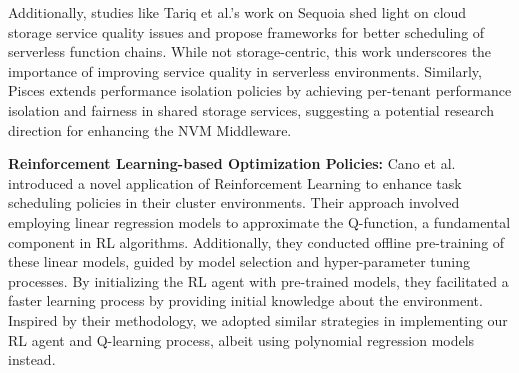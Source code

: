 Additionally, studies like Tariq et al.'s work on Sequoia \cite{tariq2020sequoia} shed light on cloud storage service quality issues and propose frameworks for better scheduling of serverless function chains. While not storage-centric, this work underscores the importance of improving service quality in serverless environments. Similarly, Pisces \cite{180275} extends performance isolation policies by achieving per-tenant performance isolation and fairness in shared storage services, suggesting a potential research direction for enhancing the NVM Middleware.

\textbf{Reinforcement Learning-based Optimization Policies:} Cano et al. \cite{cano2017curator} introduced a novel application of Reinforcement Learning to enhance task scheduling policies in their cluster environments. Their approach involved employing linear regression models to approximate the Q-function, a fundamental component in RL algorithms. Additionally, they conducted offline pre-training of these linear models, guided by model selection and hyper-parameter tuning processes. By initializing the RL agent with pre-trained models, they facilitated a faster learning process by providing initial knowledge about the environment. Inspired by their methodology, we adopted similar strategies in implementing our RL agent and Q-learning process, albeit using polynomial regression models instead.




